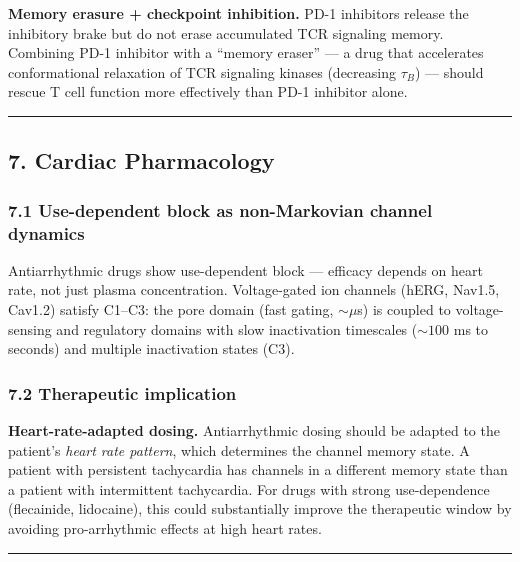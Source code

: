 \documentclass[
]{article}
\begin{document}
\textbf{Memory erasure + checkpoint inhibition.} PD-1 inhibitors release
the inhibitory brake but do not erase accumulated TCR signaling memory.
Combining PD-1 inhibitor with a ``memory eraser'' --- a drug that
accelerates conformational relaxation of TCR signaling kinases
(decreasing \(\tau_B\)) --- should rescue T cell function more
effectively than PD-1 inhibitor alone.

\begin{center}\rule{0.5\linewidth}{0.5pt}\end{center}

\hypertarget{cardiac-pharmacology}{%
\subsection{7. Cardiac Pharmacology}\label{cardiac-pharmacology}}

\hypertarget{use-dependent-block-as-non-markovian-channel-dynamics}{%
\subsubsection{7.1 Use-dependent block as non-Markovian channel
dynamics}\label{use-dependent-block-as-non-markovian-channel-dynamics}}

Antiarrhythmic drugs show use-dependent block --- efficacy depends on
heart rate, not just plasma concentration. Voltage-gated ion channels
(hERG, Nav1.5, Cav1.2) satisfy C1--C3: the pore domain (fast gating,
\(\sim \mu\)s) is coupled to voltage-sensing and regulatory domains with
slow inactivation timescales (\(\sim 100\) ms to seconds) and multiple
inactivation states (C3).

\hypertarget{therapeutic-implication-2}{%
\subsubsection{7.2 Therapeutic
implication}\label{therapeutic-implication-2}}

\textbf{Heart-rate-adapted dosing.} Antiarrhythmic dosing should be
adapted to the patient's \emph{heart rate pattern}, which determines the
channel memory state. A patient with persistent tachycardia has channels
in a different memory state than a patient with intermittent
tachycardia. For drugs with strong use-dependence (flecainide,
lidocaine), this could substantially improve the therapeutic window by
avoiding pro-arrhythmic effects at high heart rates.

\begin{center}\rule{0.5\linewidth}{0.5pt}\end{center}
\end{document}
